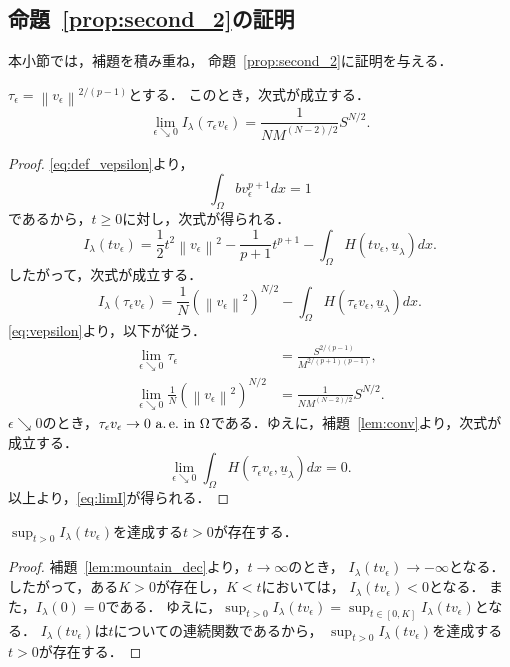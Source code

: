\subsection{命題~\ref{prop:second_2}の証明}

本小節では，補題を積み重ね，
命題~\ref{prop:second_2}に証明を与える．

\begin{lem} \label{lem:tauepsilon}
 $\tau_\epsilon = \left\| v_\epsilon \right\|^{2/(p-1)}$とする．
 このとき，次式が成立する．
 \begin{equation}
  \lim_{\epsilon \searrow 0} I_\lambda (\tau_\epsilon v_\epsilon) = 
   \frac{1}{NM^{(N-2)/2}} S^{N/2}. \label{eq:limI}
 \end{equation}
\end{lem}

\begin{proof}
 \eqref{eq:def_vepsilon}より，
 \[
  \int_\Omega bv_\epsilon^{p+1} dx = 1
 \]
 であるから，$t \geq 0$に対し，次式が得られる．
 \[
  I_\lambda(tv_\epsilon) = \frac{1}{2} t^2 \left\| v_\epsilon
 \right\|^2 - \frac{1}{p+1} t^{p+1} - \int_\Omega H(tv_\epsilon,
 \underline{u}_\lambda) dx.
 \]
 したがって，次式が成立する．
 \[
  I_\lambda(\tau_\epsilon v_\epsilon) = \frac{1}{N} \left( \left\|
 v_\epsilon \right\|^2 \right)^{N/2} - \int_\Omega H(\tau_\epsilon
 v_\epsilon, \underline{u}_\lambda) dx.
 \]
 \eqref{eq:vepsilon}より，以下が従う．
 \begin{align*}
  \lim_{\epsilon \searrow 0} \tau_\epsilon
  &= \frac{S^{2/(p-1)}}{M^{2/(p+1)(p-1)}}, \\
  \lim_{\epsilon \searrow 0} \frac{1}{N} \left( \left\|
 v_\epsilon \right\|^2 \right)^{N/2} &= \frac{1}{NM^{(N-2)/2}}
  S^{N/2}.
 \end{align*}
 $\epsilon \searrow 0$のとき，$\tau_\epsilon v_\epsilon \to 0 ~\text{a.\,e.}~
 \text{in}~ \Omega$である．ゆえに，補題~\ref{lem:conv}より，次式が成立する．
 \[
  \lim_{\epsilon \searrow 0} \int_\Omega H(\tau_\epsilon
 v_\epsilon, \underline{u}_\lambda) dx = 0.
 \]
 以上より，\eqref{eq:limI}が得られる．\qedhere
\end{proof}

\begin{lem} \label{lem:t_epsilon}
$\sup_{t > 0} I_\lambda (tv_\epsilon)$を達成する$t > 0$が存在する．
\end{lem}

\begin{proof}
補題~\ref{lem:mountain_dec}より，$t \to \infty$のとき，
$I_\lambda(t v_\epsilon) \to -\infty$となる．
したがって，ある$K>0$が存在し，$K < t$においては，
$I_\lambda(t v_\epsilon) < 0$となる．
また，$I_\lambda(0) = 0$である．
ゆえに，$\sup_{t > 0} I_\lambda (tv_\epsilon) = 
\sup_{t \in [0, K]} I_\lambda (tv_\epsilon)$となる．
$I_\lambda(tv_\epsilon)$は$t$についての連続関数であるから，
$\sup_{t > 0} I_\lambda (tv_\epsilon)$を達成する$t > 0$が存在する．\qedhere
\end{proof}

